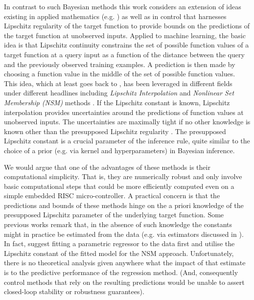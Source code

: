 
In contrast to such Bayesian methods this work considers an extension of ideas existing in applied mathematics  (e.g. \cite{Shubert:72,Zabinsky2003,Cooper1995,Cooper2006,Baran2008,Beliakov2006}) as well as in control \cite{Milanese2004,Canale2014} that harnesses Lipschitz regularity of the target function to provide bounds on the predictions of the target function at unobserved inputs. Applied to machine learning, the basic idea is that Lipschitz continuity constrains the set of possible function values of a target function at a query input as a function of the distance between the query and the previously observed training examples. A prediction is then made by choosing a function value in the middle of the set of possible function values. This idea, which at least goes back to \cite{Sukharev1978}, has been leveraged in different fields under different headlines including \emph{Lipschitz Interpolation} \cite{Zabinsky2003,Beliakov2006} and \emph{Nonlinear Set Membership (NSM)}  methods \cite{Milanese2004}. If the Lipschitz constant is known, Lipschitz interpolation provides uncertainties around the predictions of function values at unobserved inputs. The uncertainties are maximally tight if no other knowledge is known other than the presupposed Lipschitz regularity \cite{Sukharev1978,calliess2014_thesis}.
The presupposed Lipschitz constant is a crucial parameter of the inference rule, quite similar to the choice of a prior (e.g. via kernel and hyperparameters)  in Bayesian inference.

We would argue that one of the advantages of these methods is their computational simplicity. That is, they are numerically robust and only involve basic computational steps that could be more efficiently computed even on a simple embedded RISC micro-controller.
A practical concern is that the predictions and bounds of these methods hinge on the a priori knowledge of the presupposed Lipschitz parameter of the underlying target function. Some previous works remark that, in the absence of such knowledge the constants might in practice be estimated from the data (e.g. via estimators discussed in  \cite{Strongin1973,Wood1996,Beliakovsmoothing2007,Milanese2004,Beliakov2006}). In fact, \cite{Milanese2004} suggest fitting a parametric regressor to the data first and utilise the Lipschitz constant of the fitted model for the NSM approach. Unfortunately, there is no theoretical analysis given anywhere what the impact of that estimate is to the predictive performance of the regression method. (And, consequently control methods that rely on the resulting predictions would be unable to assert closed-loop stability or robustness guarantees).

